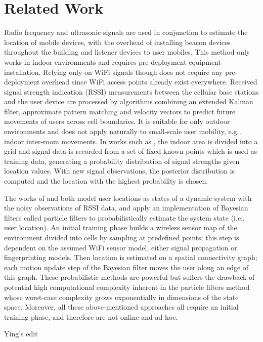 \section{Related Work}
Radio frequency and ultrasonic signals are used in conjunction \cite{priyantha2000cricket} to estimate the location of mobile devices, with the overhead of installing beacon devices throughout the building and listener devices to user mobiles.  This method only works in indoor environments and requires pre-deployment equipment installation.  Relying only on WiFi signals though does not require any pre-deployment overhead since WiFi access points already exist everywhere.
Received signal strength indication (RSSI) measurements between the cellular base stations and the user device \cite{liu1997hierarchical} are processed by algorithms combining an extended Kalman filter, approximate pattern matching and velocity vectors to predict future movements of users across cell boundaries.  It is suitable for only outdoor environments and does not apply naturally to small-scale user mobility, e.g., indoor inter-room movements.
In works such as \cite{roos2002probabilistic,smailagic2002location},
the indoor area is divided into a grid and signal data is recorded from a set of fixed known points which is used as training data, generating a probability distribution of signal strengths given location values.  With new signal observations, the posterior distribution is computed and the location with the highest probability is chosen.  

The works of \cite{seshadri2005bayesian} and \cite{letchner2005large} both model user locations as states of a dynamic system with the noisy observations of RSSI data, and apply an implementation of Bayesian filters called particle filters to probabilistically estimate the system state (i.e., user location).  An initial training phase builds a wireless sensor map of the environment divided into cells by sampling at predefined points; this step is dependent on the assumed WiFi sensor model, either signal propagation or fingerprinting models.  Then location is estimated on a spatial connectivity graph; each motion update step of the Bayesian filter moves the user along an edge of this graph.  These probabilistic methods are powerful but suffers the drawback of potential high computational complexity inherent in the particle filters method whose worst-case complexity grows exponentially in dimensions of the state space.
Moreover, all these above-mentioned approaches all require an initial training phase, and therefore are not online and ad-hoc.

Ying's edit
